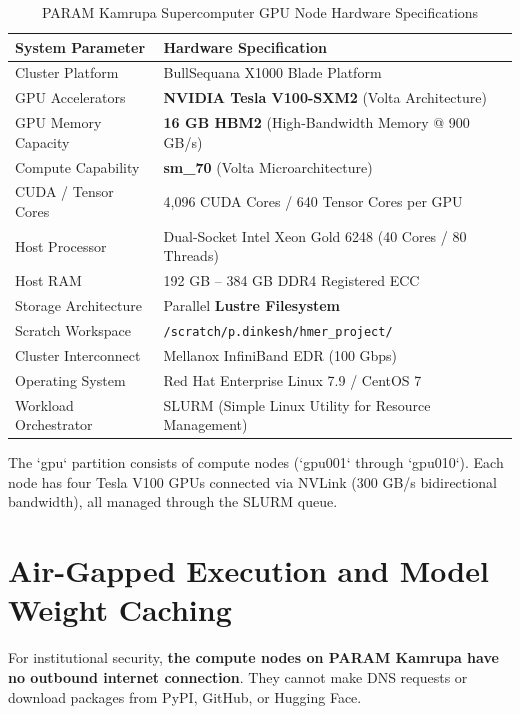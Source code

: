 \begin{table}[htbp]
\centering
\caption{PARAM Kamrupa Supercomputer GPU Node Hardware Specifications}
\label{tab:param_kamrupa_specs}
\vspace{0.2cm}
\small
\begin{tabular}{ll}
\toprule
\textbf{System Parameter} & \textbf{Hardware Specification} \\
\midrule
Cluster Platform & BullSequana X1000 Blade Platform \\
GPU Accelerators & \textbf{NVIDIA Tesla V100-SXM2} (Volta Architecture) \\
GPU Memory Capacity & \textbf{16 GB HBM2} (High-Bandwidth Memory @ 900 GB/s) \\
Compute Capability & \textbf{sm\_70} (Volta Microarchitecture) \\
CUDA / Tensor Cores & 4,096 CUDA Cores / 640 Tensor Cores per GPU \\
Host Processor & Dual-Socket Intel Xeon Gold 6248 (40 Cores / 80 Threads) \\
Host RAM & 192 GB -- 384 GB DDR4 Registered ECC \\
Storage Architecture & Parallel \textbf{Lustre Filesystem} \\
Scratch Workspace & \texttt{/scratch/p.dinkesh/hmer\_project/} \\
Cluster Interconnect & Mellanox InfiniBand EDR (100 Gbps) \\
Operating System & Red Hat Enterprise Linux 7.9 / CentOS 7 \\
Workload Orchestrator & SLURM (Simple Linux Utility for Resource Management) \\
\bottomrule
\end{tabular}
\end{table}

The `gpu` partition consists of compute nodes (`gpu001` through `gpu010`). Each node has four Tesla V100 GPUs connected via NVLink (300 GB/s bidirectional bandwidth), all managed through the SLURM queue.

\section{Air-Gapped Execution and Model Weight Caching}
\label{sec:air_gapped_provisioning}

For institutional security, \textbf{the compute nodes on PARAM Kamrupa have no outbound internet connection}. They cannot make DNS requests or download packages from PyPI, GitHub, or Hugging Face.

